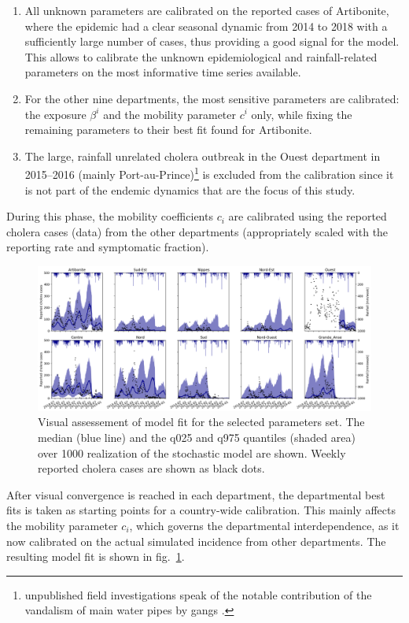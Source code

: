\begin{enumerate}
    \item All unknown parameters are calibrated on the reported cases of Artibonite, where the epidemic had a clear seasonal dynamic from 2014 to 2018 with a sufficiently large number of cases, thus providing a good signal for the model.  This allows to calibrate the unknown epidemiological and rainfall-related parameters on the most informative time series available.
    \item For the other nine departments, the most sensitive parameters are calibrated: the exposure $\beta^i$ and the mobility parameter $c^i$ only, while fixing the remaining parameters to their best fit found for Artibonite.
    \item The large, rainfall unrelated cholera outbreak in the Ouest department in 2015--2016 (mainly Port-au-Prince)\footnote{unpublished field investigations speak of the notable contribution of the vandalism of main water pipes by gangs \parencite{Rebaudet:NationalAlertresponseStrategy:2018}.} is excluded from the calibration since it is not part of the endemic dynamics that are the focus of  this study.
\end{enumerate}

During this phase, the mobility coefficients $c_i$ are calibrated using the reported cholera cases (data) from the other departments (appropriately scaled with the reporting rate and symptomatic fraction).
\begin{figure}[htbp]
\begin{center}
\includegraphics[width=1.0\textwidth]{fig_cholera-haiti-ocv/fit.png}
\caption[Visual assessement of model fit for the selected parameters set]{Visual assessement of model fit for the selected parameters set. The median (blue line) and the q025 and q975 quantiles (shaded area) over 1000 realization of the stochastic model are shown. Weekly reported cholera cases are shown as black dots.}
\label{fitEPFL}
\end{center}
\end{figure}
After visual convergence is reached in each department, the departmental best fits is taken as starting points for a country-wide calibration. This mainly affects the mobility parameter $c_i$, which governs the departmental interdependence, as it now calibrated on the actual simulated incidence from other departments. The resulting model fit is shown in fig.~\ref{fitEPFL}. 

